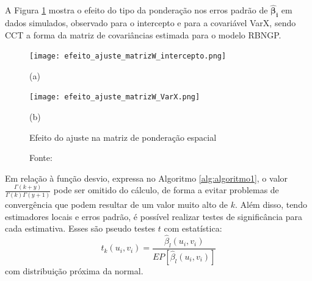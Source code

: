 \documentclass[12pt, a4paper, twoside]{report}
\numberwithin{equation}{section} %
\begin{document}
A Figura \ref{fig:figurax_eintercepto} mostra o efeito do tipo da ponderação nos erros padrão de $\boldsymbol{\hat{\beta}_i}$ em dados simulados, observado para o intercepto e para a covariável VarX, sendo CCT a forma da matriz de covariâncias estimada para o modelo RBNGP.


\begin{figure}[H]
    \centering
    \begin{minipage}{\textwidth}
        \centering
        \texttt{[image: efeito\_ajuste\_matrizW\_intercepto.png]}
        \caption*{\small(a)}
    \end{minipage}
    
    \begin{minipage}{\textwidth}
        \centering
        \texttt{[image: efeito\_ajuste\_matrizW\_VarX.png]}
        \caption*{\small(b)}
    \end{minipage}
    \caption{Efeito do ajuste na matriz de ponderação espacial}
    \caption*{\footnotesize Fonte: \cite{dasilva2023}}
    \label{fig:figurax_eintercepto}
\end{figure}




Em relação à função desvio, expressa no Algoritmo \ref{alg:algoritmo1}, o valor $\frac{\Gamma(k+y)}{\Gamma(k)\Gamma(y+1)}$ pode ser omitido do cálculo, de forma a evitar problemas de convergência que podem resultar de um valor muito alto de $k$. Além disso, tendo estimadores locais e erros padrão, é possível realizar testes de significância para cada estimativa. Esses são pseudo testes $t$ com estatística:
\begin{equation}\label{est_t_gwr}
t_k(u_i,v_i)=\frac{\hat{\beta}_l(u_i,v_i)}{EP[\hat{\beta}_l(u_i,v_i)]}
\end{equation}
com distribuição próxima da normal.
\end{document}
